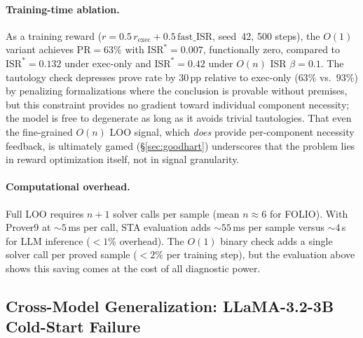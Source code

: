 \paragraph{Training-time ablation.}
As a training reward ($r = 0.5\,r_{\text{exec}} + 0.5\,\text{fast\_ISR}$, seed~42, 500 steps), the $O(1)$ variant achieves $\text{PR}{=}63\%$ with $\text{ISR}^*{=}0.007$, functionally zero, compared to $\text{ISR}^*{=}0.132$ under exec-only and $\text{ISR}^*{=}0.42$ under $O(n)$ ISR $\beta{=}0.1$.
The tautology check depresses prove rate by 30\,pp relative to exec-only ($63\%$ vs.\ $93\%$) by penalizing formalizations where the conclusion is provable without premises, but this constraint provides no gradient toward individual component necessity; the model is free to degenerate as long as it avoids trivial tautologies.
That even the fine-grained $O(n)$ LOO signal, which \emph{does} provide per-component necessity feedback, is ultimately gamed (\S\ref{sec:goodhart}) underscores that the problem lies in reward optimization itself, not in signal granularity.

\paragraph{Computational overhead.}
Full LOO requires $n{+}1$ solver calls per sample (mean $n{\approx}6$ for FOLIO).
With Prover9 at ${\sim}5$\,ms per call, STA evaluation adds ${\sim}55$\,ms per sample versus ${\sim}4$\,s for LLM inference (${<}1\%$ overhead).
The $O(1)$ binary check adds a single solver call per proved sample (${<}2\%$ per training step), but the evaluation above shows this saving comes at the cost of all diagnostic power.

\subsection{Cross-Model Generalization: LLaMA-3.2-3B Cold-Start Failure}
\label{app:llama-coldstart}

